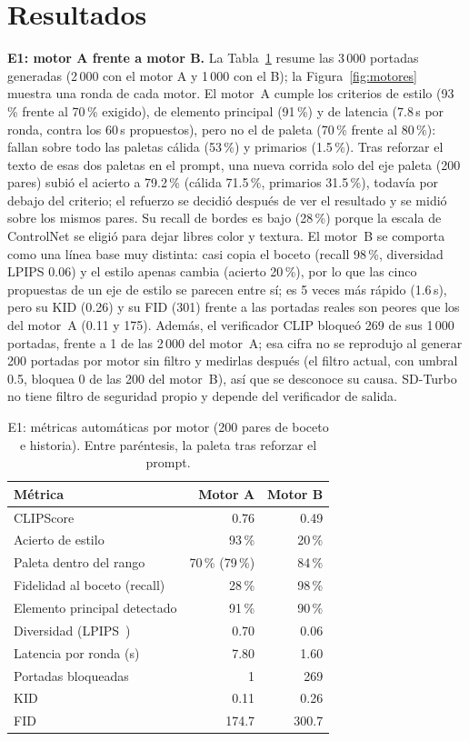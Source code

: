 \documentclass[10pt,a4paper,twocolumn]{article}
\begin{document}
\section{Resultados}\label{sec:res}
\textbf{E1: motor A frente a motor B.} La Tabla~\ref{tab:e1} resume las 3\,000 portadas generadas (2\,000 con el motor A y 1\,000 con el B); la Figura~\ref{fig:motores} muestra una ronda de cada motor. El motor~A cumple los criterios de estilo (93\,\% frente al 70\,\% exigido), de elemento principal (91\,\%) y de latencia (7.8\,s por ronda, contra los 60\,s propuestos), pero no el de paleta (70\,\% frente al 80\,\%): fallan sobre todo las paletas cálida (53\,\%) y primarios (1.5\,\%). Tras reforzar el texto de esas dos paletas en el prompt, una nueva corrida solo del eje paleta (200 pares) subió el acierto a 79.2\,\% (cálida 71.5\,\%, primarios 31.5\,\%), todavía por debajo del criterio; el refuerzo se decidió después de ver el resultado y se midió sobre los mismos pares. Su recall de bordes es bajo (28\,\%) porque la escala de ControlNet se eligió para dejar libres color y textura. El motor~B se comporta como una línea base muy distinta: casi copia el boceto (recall 98\,\%, diversidad LPIPS 0.06) y el estilo apenas cambia (acierto 20\,\%), por lo que las cinco propuestas de un eje de estilo se parecen entre sí; es 5 veces más rápido (1.6\,s), pero su KID (0.26) y su FID (301) frente a las portadas reales son peores que los del motor~A (0.11 y 175). Además, el verificador CLIP bloqueó 269 de sus 1\,000 portadas, frente a 1 de las 2\,000 del motor~A; esa cifra no se reprodujo al generar 200 portadas por motor sin filtro y medirlas después (el filtro actual, con umbral 0.5, bloquea 0 de las 200 del motor~B), así que se desconoce su causa. SD-Turbo no tiene filtro de seguridad propio y depende del verificador de salida.

\begin{table}[t]
\centering\scriptsize
\caption{E1: métricas automáticas por motor (200 pares de boceto e historia). Entre paréntesis, la paleta tras reforzar el prompt.}\label{tab:e1}
\begin{tabular}{@{}lrr@{}}
\toprule
\textbf{Métrica} & \textbf{Motor A} & \textbf{Motor B}\\
\midrule
CLIPScore & 0.76 & 0.49\\
Acierto de estilo & 93\,\% & 20\,\%\\
Paleta dentro del rango & 70\,\% (79\,\%) & 84\,\%\\
Fidelidad al boceto (recall) & 28\,\% & 98\,\%\\
Elemento principal detectado & 91\,\% & 90\,\%\\
Diversidad (LPIPS~\citealp{zhang2018}) & 0.70 & 0.06\\
Latencia por ronda (s) & 7.80 & 1.60\\
Portadas bloqueadas & 1 & 269\\
KID & 0.11 & 0.26\\
FID~\citep{heusel2017} & 174.7 & 300.7\\
\bottomrule
\end{tabular}
\end{table}
\end{document}
